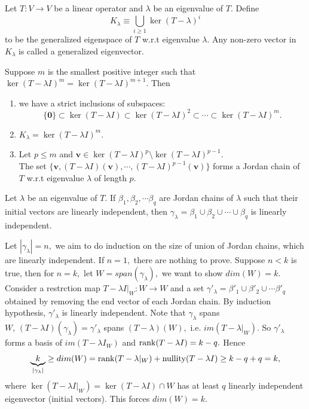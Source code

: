 \begin{definition}
    Let $T:V\to V$ be a linear operator and $\lambda$ be an eigenvalue of $T$.
    Define 
    \[K_\lambda\equiv\bigcup_{i\ge 1}\ker(T-\lambda)^i\]
    to be the generalized eigenspace of $T$ w.r.t eigenvalue $\lambda$. Any non-zero vector in $K_\lambda$ is called a generalized eigenvector.
\end{definition}

\begin{theorem}
    Suppose $m$ is the smallest positive integer such that $\ker(T-\lambda I)^m=\ker(T-\lambda I)^{m+1}.$
    Then 
    \begin{enumerate}
    \item we have a strict inclusions of subspaces:
    \[\{\mathbf{0}\}\subset\ker(T-\lambda I)\subset\ker(T-\lambda I)^2\subset\cdots\subset\ker(T-\lambda I)^m.\]
    \item $K_\lambda=\ker(T-\lambda I)^m.$
    \item Let $p\le m$ and $\mathbf{v}\in\ker(T-\lambda I)^p\setminus\ker(T-\lambda I)^{p-1}.$\\
    The set $\{\mathbf{v},(T-\lambda I)(\mathbf{v}),\cdots,(T-\lambda I)^{p-1}(\mathbf{v})\}$ forms a Jordan chain of $T$ w.r.t eigenvalue $\lambda$ of length $p.$
    \end{enumerate}
    \label{thm 7.4}
\end{theorem}


\begin{theorem}
    Let $\lambda$ be an eigenvalue of $T.$ If $\beta_1,\beta_2,\cdots\beta_q$ are Jordan chains of $\lambda$ such that their initial vectors are linearly independent, then 
    $\gamma_\lambda = \beta_1\cup\beta_2\cup\cdots\cup\beta_q$ is linearly independent.
\end{theorem}

\begin{pfbox}
Let $|\gamma_\lambda|=n,$ we aim to do induction on the size of union of Jordan chains, which are linearly independent.
If $n=1,$ there are nothing to prove. Suppose $n<k$ is true, then for $n=k,$ let $W = span(\gamma_\lambda),$ we want to show $dim(W)=k.$
Consider a restrction map $T-\lambda I|_W:W\to W$ and a set $\gamma'_\lambda=\beta'_1\cup\beta'_2\cup\cdots\beta'_q$ obtained by removing the end vector of each Jordan chain.
By induction hypothesis, $\gamma'_\lambda$ is linearly independent. Note that $\gamma_\lambda$ spans $W,\,(T-\lambda I)(\gamma_\lambda)=\gamma'_\lambda$ spans $(T-\lambda)(W),$ i.e. $im(T-\lambda|_W).$
So $\gamma'_\lambda$ forms a basis of $im(T-\lambda I_W)$ and $\operatorname{rank}(T-\lambda I)=k-q.$ Hence 
$$\underbrace{k}_{|\gamma_\lambda|}\ge dim(W)=\operatorname{rank}(T-\lambda|_W)+\operatorname{nullity}(T-\lambda I)\ge k-q + q = k,$$
where $\ker(T-\lambda I|_W)=\ker(T-\lambda I)\cap W$ has at least $q$ linearly independent eigenvector (initial vectors).
This forces $dim(W)=k.$
\end{pfbox}


